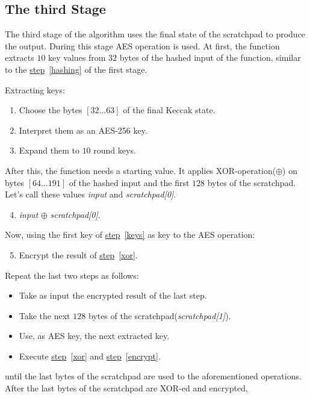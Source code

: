 \subsection{The third Stage}
The third stage of the algorithm uses the final state of the scratchpad to produce the output. During this stage AES operation is used. At first, the function extracts $10$ key values from $32$ bytes of the hashed input of the function, similar to the \hyperref[hashing]{step}~\ref{hashing} of the first stage.

\noindent Extracting keys:
\begin{enumerate}
  \item Choose the bytes $[32...63]$ of the final Keccak state.
  \item Interpret them as an AES-256 key.
  \item \label{keys} Expand them to $10$ round keys.
\end{enumerate}
After this, the function needs a starting value. It applies XOR-operation($\oplus$) on bytes $[64...191]$ of the hashed input and the first $128$ bytes of the scratchpad. Let's call these values \emph{input} and \emph{scratchpad[0]}.

\begin{enumerate}
  \setcounter{enumi}{3}
  \item \label{xor} \emph{input} $\oplus$ \emph{scratchpad[0]}.
\end{enumerate}
Now, using the first key of \hyperref[keys]{step}~\ref{keys} as key to the AES operation:

\begin{enumerate}
  \setcounter{enumi}{4}
  \item \label{encrypt} Encrypt the result of \hyperref[xor]{step}~\ref{xor}.
\end{enumerate}
Repeat the last two steps as follows:

\begin{itemize}
  \item Take as input the encrypted result of the last step.
  \item Take the next $128$ bytes of the scratchpad(\emph{scratchpad[1]}).
  \item Use, as AES key, the next extracted key.
  \item Execute \hyperref[xor]{step}~\ref{xor} and \hyperref[encrypt]{step}~\ref{encrypt}.
\end{itemize}
until the last bytes of the scratchpad are used to the aforementioned operations. After the last bytes of the scratchpad are XOR-ed and encrypted,

